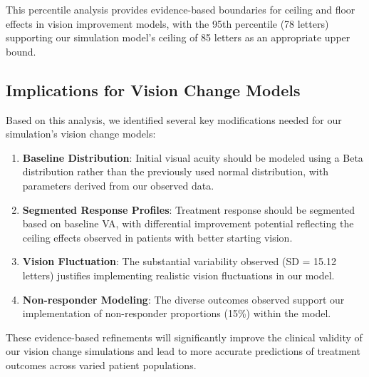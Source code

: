 This percentile analysis provides evidence-based boundaries for ceiling and floor effects in vision improvement models, with the 95th percentile (78 letters) supporting our simulation model's ceiling of 85 letters as an appropriate upper bound.

\subsection{Implications for Vision Change Models}

Based on this analysis, we identified several key modifications needed for our simulation's vision change models:

\begin{enumerate}
    \item \textbf{Baseline Distribution}: Initial visual acuity should be modeled using a Beta distribution rather than the previously used normal distribution, with parameters derived from our observed data.
    
    \item \textbf{Segmented Response Profiles}: Treatment response should be segmented based on baseline VA, with differential improvement potential reflecting the ceiling effects observed in patients with better starting vision.
    
    \item \textbf{Vision Fluctuation}: The substantial variability observed (SD = 15.12 letters) justifies implementing realistic vision fluctuations in our model.
    
    \item \textbf{Non-responder Modeling}: The diverse outcomes observed support our implementation of non-responder proportions (15\%) within the model.
\end{enumerate}

These evidence-based refinements will significantly improve the clinical validity of our vision change simulations and lead to more accurate predictions of treatment outcomes across varied patient populations.